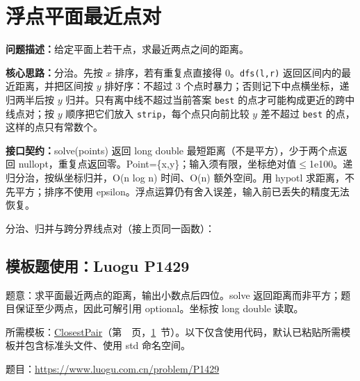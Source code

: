 \section{浮点平面最近点对}\label{compact-ClosestPair}

\noindent\textbf{问题描述：}\allowbreak 给定平面上若干点，求最近两点之间的距离。

\textbf{核心思路：}\allowbreak 分治。先按 $x$ 排序，若有重复点直接得 0。\texttt{dfs(l,r)} 返回区间内的最近距离，并把区间按 $y$ 排好序：不超过 3 个点时暴力；否则记下中点横坐标，递归两半后按 $y$ 归并。只有离中线不超过当前答案 \texttt{best} 的点才可能构成更近的跨中线点对；按 $y$ 顺序把它们放入 \texttt{strip}，每个点只向前比较 $y$ 差不超过 \texttt{best} 的点，这样的点只有常数个。



{\sloppy{}\noindent\textbf{接口契约：}solve(points) 返回 long double 最短距离（不是平方），少于两个点返回 nullopt，重复点返回零。Point=\{x,y\}；输入须有限，坐标绝对值$\le$1e100。递归分治，按纵坐标归并，O(n log n) 时间、O(n) 额外空间。用 hypotl 求距离，不先平方；排序不使用 epsilon。浮点运算仍有舍入误差，输入前已丢失的精度无法恢复。\par}

\Needspace{532pt}



\newpage

\noindent 分治、归并与跨分界线点对（接上页同一函数）：



\Needspace{254pt}

\subsection*{模板题使用：Luogu P1429}

\label{usage-example-60}

题意：求平面最近两点的距离，输出小数点后四位。solve 返回距离而非平方；题目保证至少两点，因此可解引用 optional。坐标按 long double 读取。

所需模板：\hyperref[compact-ClosestPair]{ClosestPair}（第~\pageref{compact-ClosestPair}~页，\ref{compact-ClosestPair}~节）。以下仅含使用代码，默认已粘贴所需模板并包含标准头文件、使用 std 命名空间。

题目：\url{https://www.luogu.com.cn/problem/P1429}

